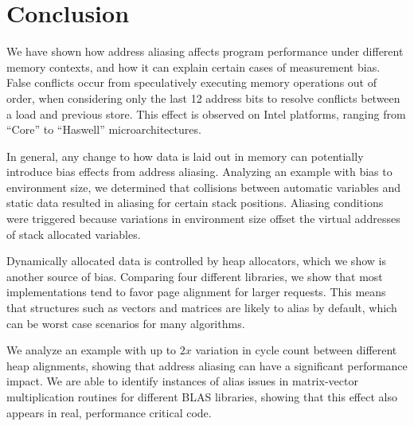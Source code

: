 \documentclass[10pt, conference, compsocconf]{IEEEtran}
\begin{document}
\section{Conclusion}
\label{sec:conclusions}
We have shown how address aliasing affects program performance under different memory contexts, and how it can explain certain cases of measurement bias.
False conflicts occur from speculatively executing memory operations out of order, when considering only the last 12 address bits to resolve conflicts between a load and previous store.
This effect is observed on Intel platforms, ranging from ``Core'' to ``Haswell'' microarchitectures.

In general, any change to how data is laid out in memory can potentially introduce bias effects from address aliasing.
Analyzing an example with bias to environment size, we determined that collisions between automatic variables and static data resulted in aliasing for certain stack positions.
Aliasing conditions were triggered because variations in environment size offset the virtual addresses of stack allocated variables.

Dynamically allocated data is controlled by heap allocators, which we show is another source of bias.
Comparing four different libraries, we show that most implementations tend to favor page alignment for larger requests.
This means that structures such as vectors and matrices are likely to alias by default, which can be worst case scenarios for many algorithms.

We analyze an example with up to $2x$ variation in cycle count between different heap alignments, showing that address aliasing can have a significant performance impact.
We are able to identify instances of alias issues in matrix-vector multiplication routines for different BLAS libraries, showing that this effect also appears in real, performance critical code.
\end{document}
